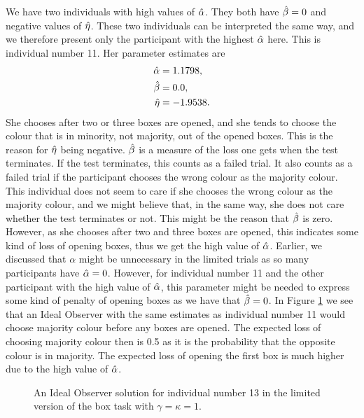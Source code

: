 We have two individuals with high values of $\hat{\alpha}$. They both have $\hat{\beta}=0$ and negative values of $\hat{\eta}$. These two individuals can be interpreted the same way, and we therefore present only the participant with the highest $\hat{\alpha}$ here. This is individual number 11. Her parameter estimates are
\begin{equation}
\label{mles_lim_person11}
    \begin{aligned}
        \hat{\alpha} &= 1.1798,\\
        \hat{\beta} &= 0.0,\\
        \hat{\eta} &= -1.9538.
    \end{aligned}
\end{equation}
She chooses after two or three boxes are opened, and she tends to choose the colour that is in minority, not majority, out of the opened boxes. This is the reason for $\hat{\eta}$ being negative. $\hat{\beta}$ is a measure of the loss one gets when the test terminates. If the test terminates, this counts as a failed trial. It also counts as a failed trial if the participant chooses the wrong colour as the majority colour. This individual does not seem to care if she chooses the wrong colour as the majority colour, and we might believe that, in the same way, she does not care whether the test terminates or not. This might be the reason that $\hat{\beta}$ is zero. However, as she chooses after two and three boxes are opened, this indicates some kind of loss of opening boxes, thus we get the high value of $\hat{\alpha}$. 
Earlier, we discussed that $\alpha$ might be unnecessary in the limited trials as so many participants have $\hat{\alpha}=0$. However, for individual number 11 and the other participant with the high value of $\hat{\alpha}$, this parameter might be needed to express some kind of penalty of opening boxes as we have that $\hat{\beta}=0$.
In Figure \ref{fig:IO_sol_person11_limited_gk1} we see that an Ideal Observer with the same estimates as individual number 11 would choose majority colour before any boxes are opened. The expected loss of choosing majority colour then is 0.5 as it is the probability that the opposite colour is in majority. The expected loss of opening the first box is much higher due to the high value of $\hat{\alpha}$. 
\begin{figure}
    \centering
    \scalebox{0.7}{}
    \caption[Ideal Observer solution individual 11, limited. $\gamma=\kappa=1$]{An Ideal Observer solution for individual number 13 in the limited version of the box task with $\gamma=\kappa=1$.}
    \label{fig:IO_sol_person11_limited_gk1}
\end{figure}



